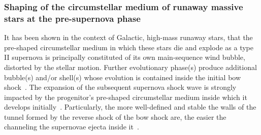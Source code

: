 \documentclass[useAMS,usenatbib]{mn2e}
\newcommand{\degree}{\ensuremath{^\circ}}
\begin{document}

\subsubsection{Shaping of the circumstellar medium of runaway massive stars at the pre-supernova phase}
\label{sect:presn}


It has been shown in the context of Galactic, high-mass runaway stars, that the 
pre-shaped circumstellar medium in which these stars die and explode as a type 
II supernova is principally constituted of its own main-sequence wind bubble, 
distorted by the stellar motion. Further evolutionary phase(s) produce 
additional bubble(s) and/or shell(s) whose evolution is contained inside the 
initial bow shock~\citep{brighenti_mnras_270_1994, brighenti_mnras_277_1995}. 
The expansion   of the subsequent supernova shock wave is strongly impacted by 
the progenitor's pre-shaped circumstellar medium inside which it develops 
initially~\citep[see, e.g.][]{cox_mnras_250_1991}. Particularly, the more 
well-defined and stable the walls of the tunnel formed by the reverse shock of 
the bow shock are, the easier the channeling the supernovae ejecta inside 
it~\citep[see in particular Appendix A of][and references 
therein]{meyer_mnras_450_2015}. 
\end{document}
